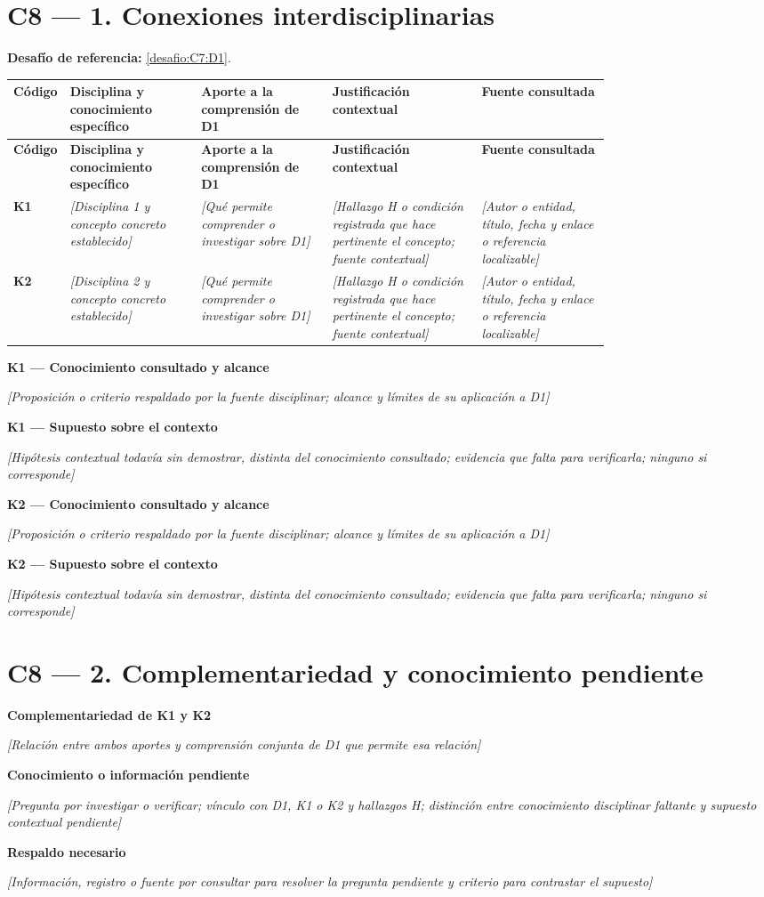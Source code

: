 \documentclass[12pt,a4paper]{article}
\newcommand{\campo}[1]{\textcolor{InstructionColor}{\textit{[#1]}}}
\newcommand{\concept}[1]{\textcolor{ConceptColor}{\textbf{#1}}}
\newcommand{\respuesta}[2]{\par\textbf{#1}\par\campo{#2}\par}
\begin{document}
\section*{C8 --- 1. Conexiones interdisciplinarias}
\textbf{Desafío de referencia:} \ref{desafio:C7:D1}.
{\small
\begin{longtable}{|P{0.09\linewidth}|P{0.22\linewidth}|P{0.22\linewidth}|P{0.25\linewidth}|P{\arrayrulewidth\relax}|}
\hline
\textbf{Código} & \textbf{Disciplina y conocimiento específico} & \textbf{Aporte a la comprensión de D1} & \textbf{Justificación contextual} & \textbf{Fuente consultada} \\\hline
\endfirsthead
\hline
\textbf{Código} & \textbf{Disciplina y conocimiento específico} & \textbf{Aporte a la comprensión de D1} & \textbf{Justificación contextual} & \textbf{Fuente consultada} \\\hline
\endhead
\concept{K1} & \campo{Disciplina 1 y concepto concreto establecido} & \campo{Qué permite comprender o investigar sobre D1} & \campo{Hallazgo H o condición registrada que hace pertinente el concepto; fuente contextual} & \campo{Autor o entidad, título, fecha y enlace o referencia localizable} \\\hline
\concept{K2} & \campo{Disciplina 2 y concepto concreto establecido} & \campo{Qué permite comprender o investigar sobre D1} & \campo{Hallazgo H o condición registrada que hace pertinente el concepto; fuente contextual} & \campo{Autor o entidad, título, fecha y enlace o referencia localizable} \\\hline
\end{longtable}
}
\respuesta{K1 --- Conocimiento consultado y alcance}{Proposición o criterio respaldado por la fuente disciplinar; alcance y límites de su aplicación a D1}
\respuesta{K1 --- Supuesto sobre el contexto}{Hipótesis contextual todavía sin demostrar, distinta del conocimiento consultado; evidencia que falta para verificarla; ninguno si corresponde}
\respuesta{K2 --- Conocimiento consultado y alcance}{Proposición o criterio respaldado por la fuente disciplinar; alcance y límites de su aplicación a D1}
\respuesta{K2 --- Supuesto sobre el contexto}{Hipótesis contextual todavía sin demostrar, distinta del conocimiento consultado; evidencia que falta para verificarla; ninguno si corresponde}

\section*{C8 --- 2. Complementariedad y conocimiento pendiente}
\respuesta{Complementariedad de K1 y K2}{Relación entre ambos aportes y comprensión conjunta de D1 que permite esa relación}
\respuesta{Conocimiento o información pendiente}{Pregunta por investigar o verificar; vínculo con D1, K1 o K2 y hallazgos H; distinción entre conocimiento disciplinar faltante y supuesto contextual pendiente}
\respuesta{Respaldo necesario}{Información, registro o fuente por consultar para resolver la pregunta pendiente y criterio para contrastar el supuesto}
\end{document}
